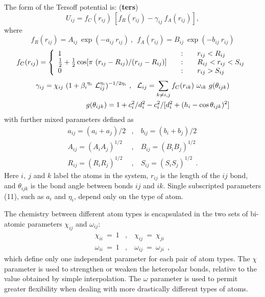 The form of the Tersoff potential is:  ({\bf ters})
\begin{equation}
U_{ij} = f_{C}(r_{ij})~[f_{R}(r_{ij}) - \gamma_{ij}~f_{A}(r_{ij})],
\end{equation}
where
\begin{equation}
f_{R}(r_{ij}) = A_{ij}~\exp(- a_{ij}~r_{ij})~,~~
f_{A}(r_{ij}) = B_{ij}~\exp(- b_{ij}~r_{ij})
\end{equation}
\begin{equation}
f_{C}(r_{ij}) = \left\{ \begin{array} {l@{\qquad:\qquad}l}
1 & r_{ij} < R_{ij} \\
\frac{1}{2} + \frac{1}{2} \cos [\pi~(r_{ij}-R_{ij})/(r_{ij}-R_{ij})] & R_{ij} < r_{ij} < S_{ij} \\
0 & r_{ij} > S_{ij}
\end{array} \right.
\end{equation}
\begin{eqnarray}
\gamma_{ij} = \chi_{ij}~(1 + {\beta_{i}}^{\eta_{i}}~{\cal{L}}_{ij}^{\eta_{i}})^{-1/2\eta_{i}}~,~~
{\cal{L}}_{ij} = \sum_{k \neq i,j} f_{C}(r_{ik})~\omega_{ik}~g(\theta_{ijk}) \nonumber \\
g(\theta_{ijk}) = 1 + c_{i}^2/d_{i}^2 - c_{i}^2/[d_{i}^2 + (h_{i} - \cos\theta_{ijk})^2]
\end{eqnarray}
with further mixed parameters defined as
\begin{eqnarray}
a_{ij} = (a_{i} + a_{j})/2&,&~b_{ij} = (b_{i} + b_{j})/2 \nonumber \\
A_{ij} = (A_{i} A_{j})^{1/2}&,&~B_{ij} = (B_{i} B_{j})^{1/2} \\
R_{ij} = (R_{i} R_{j})^{1/2}&,&~S_{ij} = (S_{i} S_{j})^{1/2}~~.
\nonumber
\end{eqnarray}
Here $i,~j$ and $k$ label the atoms in the system, $r_{ij}$ is the
length of the $ij$ bond, and $\theta_{ijk}$ is the bond angle between
bonds $ij$ and $ik$.  Single subscripted parameters (11), such as
$a_{i}$ and $\eta_{i}$, depend only on the type of atom.

The chemistry between different atom types is encapsulated in the two
sets of bi-atomic parameters $\chi_{ij}$ and $\omega_{ij}$:
\begin{eqnarray}
\chi_{ii}~=~1&,&~\chi_{ij}~=~\chi_{ji} \nonumber \\
\omega_{ii}~=~1&,&~\omega_{ij}~=~\omega_{ji}~~,
\end{eqnarray}
which define only one independent parameter for each pair of atom
types.  The $\chi$ parameter is used to strengthen or weaken the
heteropolar bonds, relative to the value obtained by simple
interpolation.  The $\omega$ parameter is used to permit greater
flexibility when dealing with more drastically different types of
atoms.

